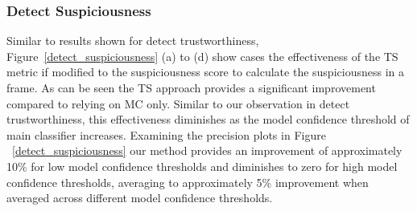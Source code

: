 

\subsubsection{Detect Suspiciousness} 
Similar to results shown for detect trustworthiness, Figure~\ref{detect_suspiciousness} (a) to (d) show cases the effectiveness of the TS metric if modified to the suspiciousness score to calculate the suspiciousness in a frame. 
As can be seen the TS approach provides a significant improvement compared to relying on MC only. Similar to our observation in detect trustworthiness, this effectiveness diminishes as the model confidence threshold of main classifier increases.
%
Examining the precision plots in Figure ~\ref{detect_suspiciousness} our method provides an improvement of approximately 10\% for low model confidence thresholds and diminishes to zero for high model confidence thresholds, averaging to approximately 5\% improvement when averaged across different model confidence thresholds.







